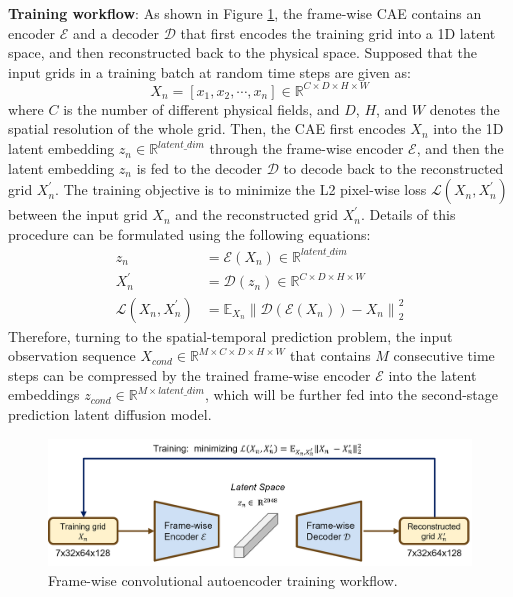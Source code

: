 \documentclass[final-report]{article-template}
\begin{document}
\textbf{Training workflow}: As shown in Figure \ref{fig:cae_training_workflow}, the frame-wise CAE contains an encoder $\mathcal{E}$ and a decoder $\mathcal{D}$ that first encodes the training grid into a 1D latent space, and then reconstructed back to the physical space. Supposed that the input grids in a training batch at random time steps are given as:
$$
    X_n = [x_1, x_2, \cdots, x_n] \in \mathbb{R}^{C \times D \times H \times W}
$$
where $C$ is the number of different physical fields, and $D$, $H$, and $W$ denotes the spatial resolution of the whole grid. Then, the CAE first encodes $X_n$ into the 1D latent embedding $z_n \in \mathbb{R}^{latent\_dim}$ through the frame-wise encoder $\mathcal{E}$, and then the latent embedding $z_n$ is fed to the decoder $\mathcal{D}$ to decode back to the reconstructed grid $X^{'}_n$. The training objective is to minimize the L2 pixel-wise loss $\mathcal{L}(X_n, X^{'}_n)$ between the input grid $X_n$ and the reconstructed grid $X^{'}_n$. Details of this procedure can be formulated using the following equations:
\begin{align}
    z_n &= \mathcal{E}(X_n) \in \mathbb{R}^{latent\_dim} \nonumber\\
    X^{'}_n &= \mathcal{D}(z_n) \in \mathbb{R}^{C \times D \times H \times W} \nonumber\\
    \mathcal{L}(X_n, X^{'}_n) &=  \mathbb{E}_{X_n}\left\|\mathcal{D}(\mathcal{E}(X_n)) - X_n\right\|^2_2
\end{align}
Therefore, turning to the spatial-temporal prediction problem, the input observation sequence $X_{cond} \in \mathbb{R}^{M \times C \times D \times H \times W}$ that contains $M$ consecutive time steps can be compressed by the trained frame-wise encoder $\mathcal{E}$ into the latent embeddings $z_{cond} \in \mathbb{R}^{M \times latent\_dim}$, which will be further fed into the second-stage prediction latent diffusion model.
\begin{figure}[htbp]
    \centering
    \includegraphics[width=15cm]{figures/cae_training_workflow.png}
    \caption{Frame-wise convolutional autoencoder training workflow.}
    \label{fig:cae_training_workflow}
\end{figure}
\end{document}
